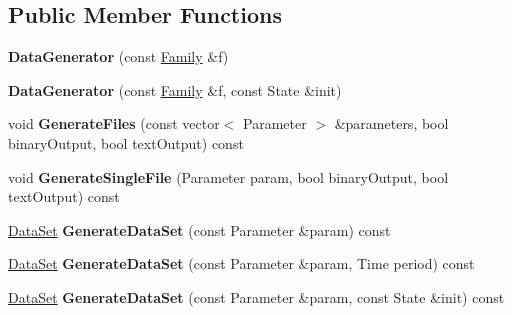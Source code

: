 \subsection*{Public Member Functions}
\begin{DoxyCompactItemize}
\item 
\hypertarget{struct_d_r_d_s_p_1_1_data_generator_a4a4cf90cd34a5a39391e300297066983}{{\bfseries Data\-Generator} (const \hyperlink{struct_d_r_d_s_p_1_1_family}{Family} \&f)}\label{struct_d_r_d_s_p_1_1_data_generator_a4a4cf90cd34a5a39391e300297066983}

\item 
\hypertarget{struct_d_r_d_s_p_1_1_data_generator_a5a941cc6ff7879e3575044db26ef9fd1}{{\bfseries Data\-Generator} (const \hyperlink{struct_d_r_d_s_p_1_1_family}{Family} \&f, const State \&init)}\label{struct_d_r_d_s_p_1_1_data_generator_a5a941cc6ff7879e3575044db26ef9fd1}

\item 
\hypertarget{struct_d_r_d_s_p_1_1_data_generator_a75dada039d5a70edd9c66044d525177b}{void {\bfseries Generate\-Files} (const vector$<$ Parameter $>$ \&parameters, bool binary\-Output, bool text\-Output) const }\label{struct_d_r_d_s_p_1_1_data_generator_a75dada039d5a70edd9c66044d525177b}

\item 
\hypertarget{struct_d_r_d_s_p_1_1_data_generator_a869d99350afa0c0bbe7a7d3579bd4ee5}{void {\bfseries Generate\-Single\-File} (Parameter param, bool binary\-Output, bool text\-Output) const }\label{struct_d_r_d_s_p_1_1_data_generator_a869d99350afa0c0bbe7a7d3579bd4ee5}

\item 
\hypertarget{struct_d_r_d_s_p_1_1_data_generator_a2527e7273aaf2d4752ddd8a0272d7cd5}{\hyperlink{struct_d_r_d_s_p_1_1_data_set}{Data\-Set} {\bfseries Generate\-Data\-Set} (const Parameter \&param) const }\label{struct_d_r_d_s_p_1_1_data_generator_a2527e7273aaf2d4752ddd8a0272d7cd5}

\item 
\hypertarget{struct_d_r_d_s_p_1_1_data_generator_ab8e0ad4602c07ebfe6d4081ea0a60e01}{\hyperlink{struct_d_r_d_s_p_1_1_data_set}{Data\-Set} {\bfseries Generate\-Data\-Set} (const Parameter \&param, Time period) const }\label{struct_d_r_d_s_p_1_1_data_generator_ab8e0ad4602c07ebfe6d4081ea0a60e01}

\item 
\hypertarget{struct_d_r_d_s_p_1_1_data_generator_a065083b18b9e8256873b3db6ac4af502}{\hyperlink{struct_d_r_d_s_p_1_1_data_set}{Data\-Set} {\bfseries Generate\-Data\-Set} (const Parameter \&param, const State \&init) const }\label{struct_d_r_d_s_p_1_1_data_generator_a065083b18b9e8256873b3db6ac4af502}


\end{DoxyCompactItemize}
